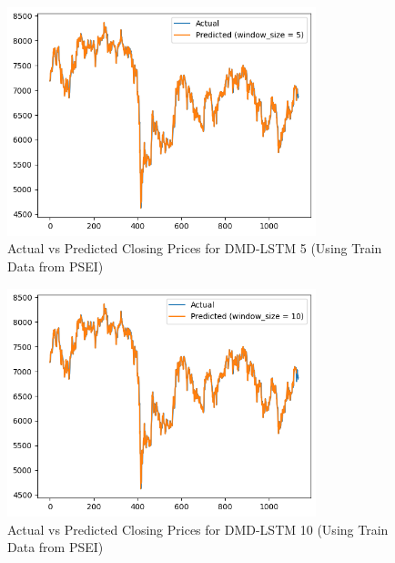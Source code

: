 \begin{figure}[ht]
    \centering
    \includegraphics[width=0.80\textwidth]{./assets/Appendices/B/Model_Testing/dmd_lstm5.png}
    \caption{Actual vs Predicted Closing Prices for DMD-LSTM 5 (Using Train Data from PSEI)}
    \label{fig:modelTest_dmd_lstm5}
\end{figure}
\FloatBarrier

\begin{figure}[ht]
    \centering
    \includegraphics[width=0.80\textwidth]{./assets/Appendices/B/Model_Testing/dmd_lstm10.png}
    \caption{Actual vs Predicted Closing Prices for DMD-LSTM 10 (Using Train Data from PSEI)}
    \label{fig:modelTest_dmd_lstm10}
\end{figure}
\FloatBarrier

